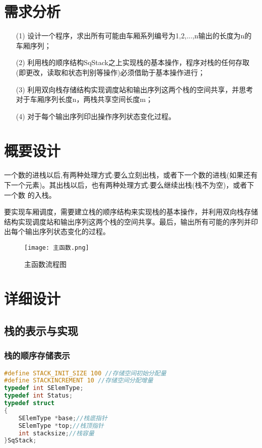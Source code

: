 \documentclass{DateStructure}
\begin{document}
	
\makecover
\newpage
\thispagestyle{empty}
\tableofcontents   
\newpage
\setcounter{page}{1} 
	
\section{需求分析}
\begin{itemize}
\item[(1)]设计一个程序，求出所有可能由车厢系列编号为1,2,...,n输出的长度为n的车厢序列；
\item[(2)]利用栈的顺序结构SqStack之上实现栈的基本操作，程序对栈的任何存取(即更改，读取和状态判别等操作)必须借助于基本操作进行；
\item[(3)]利用双向栈存储结构实现调度站和输出序列这两个栈的空间共享，并思考对于车厢序列长度n，两栈共享空间长度m；
\item[(4)]对于每个输出序列印出操作序列状态变化过程。
\end{itemize}

\section{概要设计}
一个数的进栈以后,有两种处理方式:要么立刻出栈，或者下一个数的进栈(如果还有下一个元素)。其出栈以后，也有两种处理方式:要么继续出栈(栈不为空)，或者下一个数
的入栈。\par
要实现车厢调度，需要建立栈的顺序结构来实现栈的基本操作，并利用双向栈存储结构实现调度站和输出序列这两个栈的空间共享。最后，输出所有可能的序列并印出每个输出序列状态变化的过程。\par

\begin{figure}[H] 
\centering
\texttt{[image: 主函数.png]}
\caption{主函数流程图}
\end{figure}

\section{详细设计}
\subsection{栈的表示与实现}
\subsubsection{栈的顺序存储表示}
\begin{lstlisting}[language=C,caption={栈的顺序存储}]
#define STACK_INIT_SIZE 100 //存储空间初始分配量
#define STACKINCREMENT 10 //存储空间分配增量
typedef int SElemType;
typedef int Status;
typedef struct
{
    SElemType *base;//栈底指针
    SElemType *top;//栈顶指针
    int stacksize;//栈容量
}SqStack;
\end{lstlisting}
\end{document}

